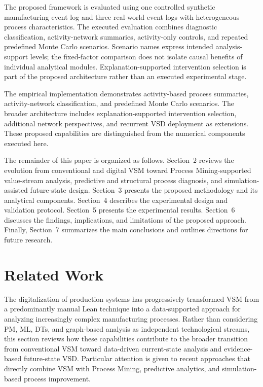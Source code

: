 \documentclass[pdflatex,iicol,Numbered,sn-basic]{sn-jnl}
\begin{document}
The proposed framework is evaluated using one controlled synthetic manufacturing
event log and three real-world event logs with heterogeneous process characteristics.
The executed evaluation combines diagnostic classification, activity-network summaries, activity-only controls, and repeated predefined Monte Carlo scenarios. Scenario names express intended analysis-support levels; the fixed-factor comparison does not isolate causal benefits of individual analytical modules. Explanation-supported intervention selection is part of the proposed architecture rather than an executed experimental stage.

The empirical implementation demonstrates activity-based process summaries, activity-network classification, and predefined Monte Carlo scenarios. The broader architecture includes explanation-supported intervention selection, additional network perspectives, and recurrent VSD deployment as extensions. These proposed capabilities are distinguished from the numerical components executed here.

The remainder of this paper is organized as follows. Section~2 reviews the
evolution from conventional and digital VSM toward Process Mining-supported
value-stream analysis, predictive and structural process diagnosis, and
simulation-assisted future-state design. Section~3 presents the proposed
methodology and its analytical components. Section~4 describes the experimental
design and validation protocol. Section~5 presents the experimental results.
Section~6 discusses the findings, implications, and limitations of the proposed
approach. Finally, Section~7 summarizes the main conclusions and outlines
directions for future research.


\section{Related Work}
\label{sec:related_work}

The digitalization of production systems has progressively transformed VSM from a predominantly manual Lean technique into a
data-supported approach for analyzing increasingly complex manufacturing
processes. Rather than considering PM, ML,
DTs, and graph-based analysis as independent technological
streams, this section reviews how these capabilities contribute to the broader
transition from conventional VSM toward data-driven current-state analysis and
evidence-based future-state VSD. Particular attention is
given to recent approaches that directly combine VSM with Process Mining,
predictive analytics, and simulation-based process improvement.
\end{document}
